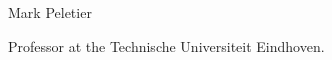 \begin{participant}[type=leadPI,PM=24,gender=male,salary=5500]{Mark Peletier}

Professor at the Technische Universiteit Eindhoven.

\end{participant}

